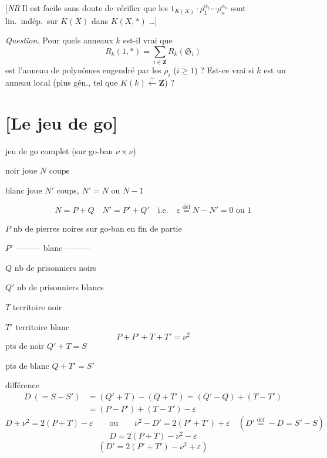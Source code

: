 \documentclass[11pt,a4paper]{article}
\begin{document}
[\emph{NB} Il est facile sans doute de vérifier que les
$1_{K(X)} \cdot \rho_1^{\alpha_1} \cdots \rho_n^{\alpha_n}$ sont
lin.\ indép.\ sur $K(X)$ dans $K(X, *)$ …]

\emph{Question.} Pour quels anneaux $k$ est-il vrai que
\[
  R_k(1, *) = \sum_{i \in \mathbf{Z}} R_k(\mathfrak{S}_i)
\]
est l'anneau de polynômes engendré par les $\rho_i$ ($i \geqslant 1$) ?
Est-ce vrai si $k$ est un anneau local (plus gén., tel que
$K(k) \xleftarrow{\sim} \mathbf{Z}$) ?

\section{[Le jeu de go]}

jeu de go complet (sur go-ban $\nu \times \nu$)

noir joue $N$ coups

blanc joue $N'$ coups, \quad $N' = N$ ou $N - 1$

\[
  \boxed{N = P + Q} \quad \boxed{N' = P' + Q'} \quad \text{i.e.} \quad
  \boxed{\varepsilon \overset{\text{déf}}{=} N - N' = 0 \text{ ou } 1}
\]

$P$ nb de pierres noires sur go-ban en fin de partie

$P'$ \quad ——— blanc ———

$Q$ nb de prisonniers noirs

$Q'$ nb de prisonniers blancs

$T$ territoire noir

$T'$ territoire blanc
\[
  \boxed{P + P' + T + T' = \nu^2}
\]
pts de noir \quad $Q' + T = S$

pts de blanc \quad $Q + T' = S'$

différence
\begin{align*}
  D \ (= S - S') &= (Q' + T) - (Q + T') = (Q' - Q) + (T - T') \\
  &= (P - P') + (T - T') - \varepsilon
\end{align*}
\[
  D + \nu^2 = 2(P + T) - \varepsilon \qquad \text{ou} \qquad
  \nu^2 - D' = 2(P' + T') + \varepsilon \quad
  (D' \overset{\text{déf}}{=} -D = S' - S)
\]
\[
  \boxed{D = 2(P + T) - \nu^2 - \varepsilon}
\]
\[
  (D' = 2(P' + T') - \nu^2 + \varepsilon)
\]
\end{document}
